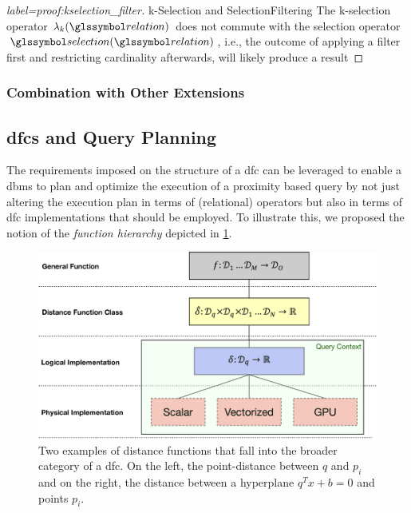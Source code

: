 \begin{proof}[label=proof:kselection_filter]{k-Selection and SelectionFiltering}{}
    The k-selection operator $\lambda_k(\relation)$ does not commute with the selection operator $\selection(\relation)$, i.e., the outcome of applying a filter first and restricting cardinality afterwards, will likely produce a result 
    
\end{proof}


\subsubsection{Combination with Other Extensions}


\subsection{\texorpdfstring{\acrshort{dfc}s}{DFCs} and Query Planning}
\label{section:dfc_and_planning}

The requirements imposed on the structure of a \acrshort{dfc} can be leveraged to enable a \acrshort{dbms} to plan and optimize the execution of a proximity based query by not just altering the execution plan in terms of (relational) operators but also in terms of \acrshort{dfc} implementations that should be employed. To illustrate this, we proposed the notion of the \emph{function hierarchy} depicted in \ref{figure:function_hierarchy}.

\begin{figure}[bt]
    \centering
    \includegraphics[width=\textwidth]{figures/function_hierarchy.eps}
    \caption{Two examples of distance functions that fall into the broader category of a \acrshort{dfc}. On the left, the point-distance between $q$ and $p_i$ and on the right, the distance between a hyperplane $q^Tx+b = 0$ and points $p_i$.}
    \label{figure:function_hierarchy}
\end{figure}

